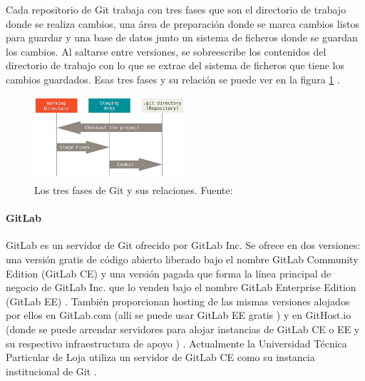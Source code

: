 Cada repositorio de Git trabaja con tres fases que son el directorio de trabajo donde se realiza cambios, una área de preparación donde se marca cambios listos para guardar y una base de datos junto un sistema de ficheros donde se guardan los cambios. Al saltarse entre versiones, se sobreescribe los contenidos del directorio de trabajo con lo que se extrae del sistema de ficheros que tiene los cambios guardados. Esas tres fases y su relación se puede ver en la figura \ref{Git-Fases} \citep{PROGIT-Git-Intro}.

\begin{figure}
  \begin{center}
      \includegraphics[width=0.5\textwidth]{Figures/git-fases.png}
  \end{center}
  \caption{Los tres fases de Git y sus relaciones. Fuente: \citep{PROGIT-Git-Intro}}
  \label{Git-Fases}
\end{figure}

\paragraph{GitLab}
GitLab es un servidor de Git ofrecido por GitLab Inc. Se ofrece en dos versiones: una versión gratis \citep{GitLab-Products} de código abierto liberado bajo el nombre GitLab Community Edition (GitLab CE) y una versión pagada que forma la línea principal de negocio de GitLab Inc. que lo venden bajo el nombre GitLab Enterprise Edition (GitLab EE) \citep{GitLab-About}. También proporcionan hosting de las mismas versiones alojados por ellos en GitLab.com (alli se puede usar GitLab EE gratis \citep{GitLab-GitLab.com} \citep{GitLab-Products}) y en GitHost.io (donde se puede arrendar servidores para alojar instancias de GitLab CE o EE y su respectivo infraestructura de apoyo \citep{GitHost.io}) \citep{GitLab-About}. Actualmente la Universidad Técnica Particular de Loja utiliza un servidor de GitLab CE como su instancia institucional de Git \citep{UTPL-GitLab}.

